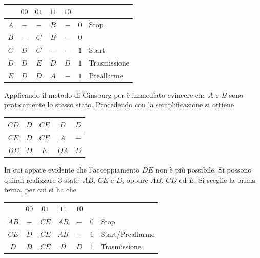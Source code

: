 \documentclass[a4paper]{extarticle}
\renewcommand\arraystretch{}
\begin{document}
\vspace{1em}
\noindent
\begin{table}[H]
\setlength{\tabcolsep}{4pt}
\renewcommand{\arraystretch}{1.2}
\centering
\begin{tabular}{c|cccc|cl}
        & $00$ & $01$ & $11$ & $10$ & & \\
    \hline
    $A$ & $-$         & $-$          & $B$          & $-$         & $0$ & Stop\\ 
    $B$ & $-$         & $C$          & $\boxed{B}$  & $-$         & $0$ & \\
    $C$ & $D$         & $\boxed{C}$  & $-$          & $-$         & $1$ & Start\\
    $D$ & $\boxed{D}$ & $E$          & $\boxed{D}$  & $\boxed{D}$ & $1$ & Trasmissione\\
    $E$ & $D$         & $\boxed{D}$  & $A$          & $-$         & $1$ & Preallarme\\
\end{tabular}
\end{table}

\vspace{1em}
\noindent
Applicando il metodo di Ginsburg per è immediato evincere che $A$ e $B$ sono praticamente lo stesso stato. Procedendo con la semplificazione si ottiene

\vspace{1em}
\noindent
\begin{table}[H]
\setlength{\tabcolsep}{4pt}
\renewcommand{\arraystretch}{1.2}
\centering
\begin{tabular}{c|c|c|c|c}
    $CD$ & $D$ & $CE$ & $D$ & $D$\\
    \hline
    $CE$ & $D$ & $CE$ & $A$ & $-$\\
    \hline
    $DE$ & $D$ & $E$ & $DA$ & $D$
\end{tabular}
\end{table}

\noindent
In cui appare evidente che l'accoppiamento $DE$ non è più possibile. Si possono quindi realizzare $3$ stati: $AB$, $CE$ e $D$, oppure $AB$, $CD$ ed $E$. Si sceglie la prima terna, per cui si ha che

\vspace{1em}
\noindent
\begin{table}[H]
\setlength{\tabcolsep}{4pt}
\renewcommand{\arraystretch}{1.2}
\centering
\begin{tabular}{c|c|c|c|c|cl}
         & $00$ & $01$ & $11$ & $10$\\
    $AB$ & $-$  & $CE$ & $AB$ & $-$ & $0$ & Stop\\
    \hline
    $CE$ & $D$  & $CE$ & $AB$ & $-$ & $1$ & Start/Preallarme\\
    \hline
    $D$  & $D$  & $CE$ & $D$ & $D$ & $1$ & Trasmissione
\end{tabular}
\end{table}
\end{document}
